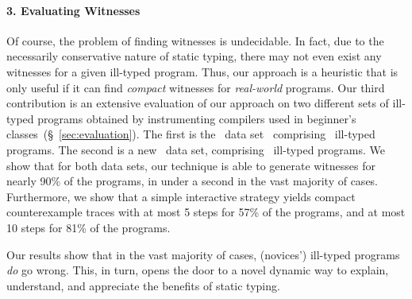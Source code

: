 \paragraph{3. Evaluating Witnesses}
%
Of course, the problem of finding witnesses is
undecidable. In fact, due to the necessarily
conservative nature of static typing, there
may not even exist any witnesses for a given
ill-typed program.
%
Thus, our approach is a heuristic that is only useful
if it can find \emph{compact} witnesses for
\emph{real-world} programs.
%
Our third contribution is an extensive evaluation of our approach
on two different sets of ill-typed programs obtained by instrumenting
compilers used in beginner's classes~(\S~\ref{sec:evaluation}).
%
The first is the \uwbench\ data set~\cite{lerner_searching_2007}
comprising \uwsize\ ill-typed programs.
%
The second is a new \ucsdbench\ data set, comprising \ucsdsize\
ill-typed programs.
%
We show that for both data sets, our technique is able to generate
witnesses for nearly 90\% of the programs, in under a second in the
vast majority of cases.
%
Furthermore, we show that a simple interactive strategy yields
compact counterexample traces with at most 5 steps for 57\%
of the programs, and at most 10 steps for 81\% of the programs.

\smallskip
Our results show that in the vast majority of
cases, (novices') ill-typed programs \emph{do} go wrong.
This, in turn, opens the door to a novel dynamic way to
explain, understand, and appreciate the benefits of static typing.

